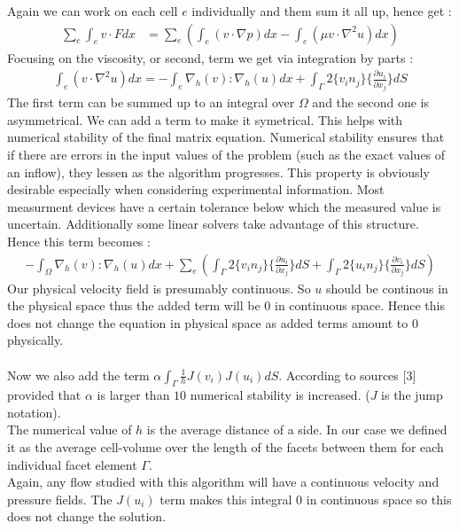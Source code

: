 \documentclass[11pt,twoside,a4paper]{article}
\begin{document}
Again we can work on each cell $e$ individually and them sum it all up, hence get :
\begin{align*}
\sum_e \int_e v \cdot F dx &= \sum_e (\int_e (v \cdot \nabla p) dx - \int_e (\mu v \cdot \nabla^2 u) dx)
\end{align*}
Focusing on the viscosity, or second, term we get via integration by parts :
\begin{align*}
\int_e (v \cdot \nabla^2 u) dx = - \int_e \nabla_h(v) : \nabla_h(u) dx + \int_\Gamma 2 \{ v_i n_j \} \{ \frac{\partial u_i}{\partial x_j}\} dS
\end{align*}
The first term can be summed up to an integral over $\Omega$ and the second one is asymmetrical. We can add a term to make it symetrical. This helps with numerical stability of the final matrix equation. Numerical stability ensures that if there are errors in the input values of the problem (such as the exact values of an inflow), they lessen as the algorithm progresses. This property is obviously desirable especially when considering experimental information. Most measurment devices have a certain tolerance below which the measured value is uncertain. Additionally some linear solvers take advantage of this structure.\\
Hence this term becomes :
\begin{align*}
-  \int_\Omega \nabla_h(v) : \nabla_h(u) dx + \sum_e( \int_\Gamma 2 \{ v_i n_j \} \{ \frac{\partial u_i}{\partial x_j}\} dS + \int_\Gamma 2 \{ u_i n_j \} \{ \frac{\partial v_i}{\partial x_j}\} dS)
\end{align*}
Our physical velocity field is presumably continuous.
So $u$ should be continous in the physical space thus the added term will be $0$ in continuous space. Hence this does not change the equation in physical space as added terms amount to $0$ physically.\\
\\
Now we also add the term $\alpha \int_\Gamma \frac{1}{h}  J(v_i) J(u_i) dS$. According to sources [3] provided that  $\alpha$ is larger than $10$ numerical stability is increased.
($J$ is the jump notation).\\
The numerical value of $h$ is the average distance of a side. In our case we defined it as the average cell-volume over the length of the facets between them for each individual facet element $\Gamma$.\\
Again, any flow studied with this algorithm will have a continuous velocity and pressure fields. The $J(u_i)$ term makes this integral $0$ in continuous space so this does not change the solution.\\
\end{document}
